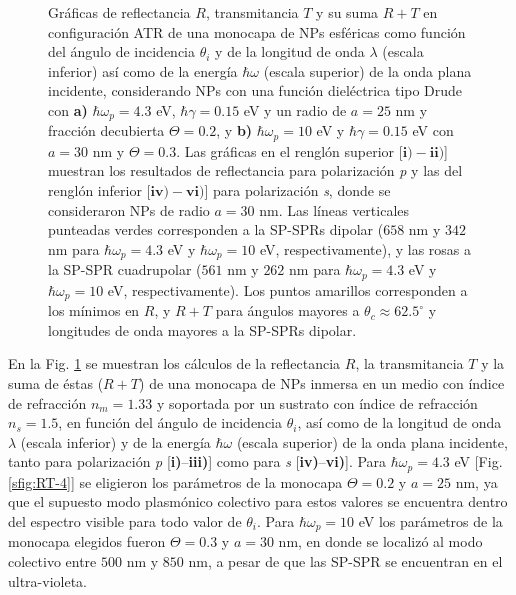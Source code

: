 \begin{figure}[h!]
\begin{subfigure}{.7\linewidth}
		\end{subfigure}\vspace*{-.5em}
	\caption{Gráficas de reflectancia $R$, transmitancia $T$ y su suma $R+T$ en configuración ATR de una monocapa de NPs esféricas como función del ángulo de incidencia $\theta_i$ y de la longitud de onda $\lambda$ (escala inferior) así como de la energía $\hbar\omega$ (escala superior) de la onda plana incidente, considerando NPs con una función dieléctrica tipo Drude con \textbf{a)} $\hbar\omega_p=4. 3$ eV,  $\hbar\gamma=0. 15$ eV y un radio de $a=25$ nm y fracción decubierta $\Theta=0.2$, y \textbf{b)} $\hbar\omega_p = 10$ eV y $\hbar\gamma = 0.15$ eV con $a=30$ nm y $\Theta=0.3$.  Las gráficas   en el renglón superior [$\mathbf{i)-ii)}$]  muestran los resultados de reflectancia para  polarización \emph{p} y las del renglón inferior  [$\mathbf{iv)-vi)}$] para polarización  \emph{s}, donde se consideraron NPs de radio $a=30$ nm. Las líneas verticales punteadas verdes corresponden a la SP-SPRs dipolar ($658$ nm y $342$ nm para $\hbar\omega_p=4.3$ eV y $\hbar\omega_p = 10$ eV, respectivamente), y las rosas a la SP-SPR cuadrupolar ($561$ nm y $262$ nm para $\hbar\omega_p=4.3$ eV y $\hbar\omega_p = 10$ eV, respectivamente). Los puntos amarillos corresponden a los mínimos en $R$, y $R+T$ para ángulos mayores a $\theta_c\approx 62.5^\circ$ y longitudes de onda mayores a la SP-SPRs dipolar. }\label{fig:RT-Omegas}
	\end{figure}	

En la Fig. \ref{fig:RT-Omegas} se muestran los cálculos de la reflectancia $R$, la transmitancia $T$ y la suma de éstas ($R+T$) de una monocapa de NPs inmersa en un medio con índice de refracción $n_m=1.33$ y soportada por un sustrato con índice de refracción $n_s=1.5$, en función del ángulo de incidencia $\theta_i$, así como de la longitud de onda $\lambda$ (escala inferior) y de la energía  $\hbar\omega$ (escala superior) de la onda plana incidente, tanto para polarización \emph{p}  [\textbf{i)}--\textbf{iii)}] como para \emph{s} [\textbf{iv)}--\textbf{vi)}]. Para $\hbar\omega_p=4.3$ eV [Fig. \ref{sfig:RT-4}] se eligieron los parámetros de la monocapa $\Theta=0.2$ y $a=25$ nm, ya que el supuesto modo plasmónico colectivo para estos valores se encuentra dentro del espectro visible para todo valor de $\theta_i$. Para $\hbar\omega_p=10$ eV los parámetros de la monocapa elegidos fueron $\Theta=0.3$ y $a=30$ nm, en donde se localizó al modo colectivo entre $500$ nm y $850$ nm, a pesar de que las SP-SPR se encuentran en el ultra-violeta.

